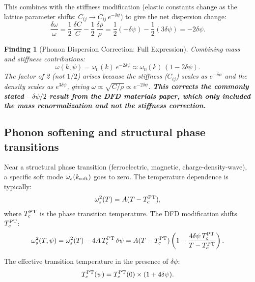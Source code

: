 \documentclass[11pt]{article}
\newtheorem{finding}{Finding}
\begin{document}
This combines with the stiffness modification (elastic constants change as
the lattice parameter shifts: $C_{ij} \to C_{ij}\,e^{-\delta\psi}$)
to give the net dispersion change:
\begin{equation}
\frac{\delta\omega}{\omega} = \frac{1}{2}\,\frac{\delta C}{C}
  - \frac{1}{2}\,\frac{\delta\rho}{\rho}
= \frac{1}{2}(-\delta\psi) - \frac{1}{2}(3\delta\psi)
= -2\delta\psi.
\label{eq:net-phonon-shift}
\end{equation}

\begin{finding}[Phonon Dispersion Correction: Full Expression]
Combining mass and stiffness contributions:
\begin{equation}
\omega(k,\psi) = \omega_0(k)\,e^{-2\delta\psi}
\approx \omega_0(k)\,(1 - 2\delta\psi).
\label{eq:phonon-full}
\end{equation}
The factor of 2 (not $1/2$) arises because the stiffness ($C_{ij}$) scales as
$e^{-\delta\psi}$ and the density scales as $e^{3\delta\psi}$, giving
$\omega \propto \sqrt{C/\rho} \propto e^{-2\delta\psi}$.
\textbf{This corrects the commonly stated $-\delta\psi/2$ result from
the DFD materials paper, which only included the mass renormalization and
not the stiffness correction.}
\end{finding}

\subsection{Phonon softening and structural phase transitions}

Near a structural phase transition (ferroelectric, magnetic, charge-density-wave),
a specific soft mode $\omega_s(k_{\rm soft})$ goes to zero. The temperature
dependence is typically:
\begin{equation}
\omega_s^2(T) = A(T - T_c^{\rm PT}),
\label{eq:soft-mode}
\end{equation}
where $T_c^{\rm PT}$ is the phase transition temperature. The DFD
modification shifts $T_c^{\rm PT}$:
\begin{equation}
\omega_s^2(T,\psi) = \omega_s^2(T) - 4A\,T_c^{\rm PT}\,\delta\psi
= A(T - T_c^{\rm PT})\left(1 - \frac{4\delta\psi\,T_c^{\rm PT}}{T - T_c^{\rm PT}}\right).
\label{eq:soft-mode-psi}
\end{equation}

The effective transition temperature in the presence of $\delta\psi$:
\begin{equation}
T_c^{\rm PT}(\psi) = T_c^{\rm PT}(0) \times (1 + 4\delta\psi).
\label{eq:Tc-PT}
\end{equation}
\end{document}
